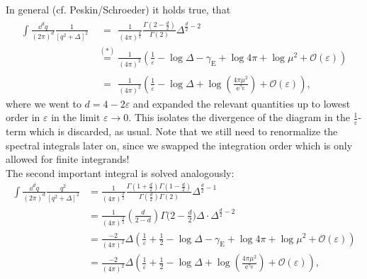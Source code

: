 \documentclass[digital, %
			   openright, %
			   parskip=half,
			   11pt]{mythesis}
\begin{document}
In general (cf. Peskin/Schroeder) it holds true, that 
\begin{equation}
\begin{aligned}
	\int \frac{\dd^d q}{(2\pi)^d} \frac{1}{\left[q^2 + \Delta\right]^2} &\overset{\phantom{(*)}}{=}  \frac{1}{(4\pi)^{\frac{d}{2}}} \frac{\Gamma(2-\frac{d}{2})}{\Gamma(2)} \Delta^{\frac{d}{2}-2} \\
	&\overset{(*)}{=} \frac{1}{(4\pi)^{2}}\left(\frac{1}{\varepsilon} - \operatorname{log}\Delta - \gamma_{\mathrm{E}} + \operatorname{log} 4\pi + \operatorname{log} \mu^2 + \mathcal{O}(\varepsilon)\right)\\
	&\overset{\phantom{(*)}}{=} \frac{1}{(4\pi)^{2}}\left(\frac{1}{\varepsilon} - \operatorname{log}\Delta + \operatorname{log}\left(\frac{4\pi\mu^2}{\operatorname{e}^{\gamma_{\mathrm{E}}}}\right)   + \mathcal{O}(\varepsilon)\right),
	\end{aligned}
\end{equation}
where we went to $d= 4 -2\varepsilon$ and expanded the relevant quantities up to lowest order in $\varepsilon$ in the limit $\varepsilon\rightarrow 0$. This isolates the divergence of the diagram in the $\frac{1}{\varepsilon}$-term which is discarded, as usual. Note that we still need to renormalize the spectral integrals later on, since we swapped the integration order which is only allowed for finite integrands!\\
The second important integral is solved analogously:
\begin{equation}
\begin{aligned}
	\int \frac{\dd^d q}{(2\pi)^d} \frac{q^2}{\left[q^2 + \Delta\right]^2} &=  \frac{1}{(4\pi)^{\frac{d}{2}}} \frac{\Gamma(1+\frac{d}{2})\Gamma(1-\frac{d}{2})}{\Gamma(\frac{d}{2})\Gamma(2)} \Delta^{\frac{d}{2}-1} \\
	&= \frac{1}{(4\pi)^{\frac{d}{2}}}\left(\frac{d}{2-d}\right)\Gamma\big(2-\frac{d}{2}\big) \Delta\cdot\Delta^{\frac{d}{2}-2} \\
	&= \frac{-2}{(4\pi)^{2}}\Delta\left(\frac{1}{\varepsilon} +\frac{1}{2}- \operatorname{log}\Delta - \gamma_{\mathrm{E}} + \operatorname{log} 4\pi + \operatorname{log} \mu^2 + \mathcal{O}(\varepsilon)\right)\\
	&= \frac{-2}{(4\pi)^{2}}\Delta\left(\frac{1}{\varepsilon} +\frac{1}{2} - \operatorname{log}\Delta + \operatorname{log}\left(\frac{4\pi\mu^2}{\operatorname{e}^{\gamma_{\mathrm{E}}}}\right)   + \mathcal{O}(\varepsilon)\right),
	\end{aligned}
\end{equation}
\end{document}
